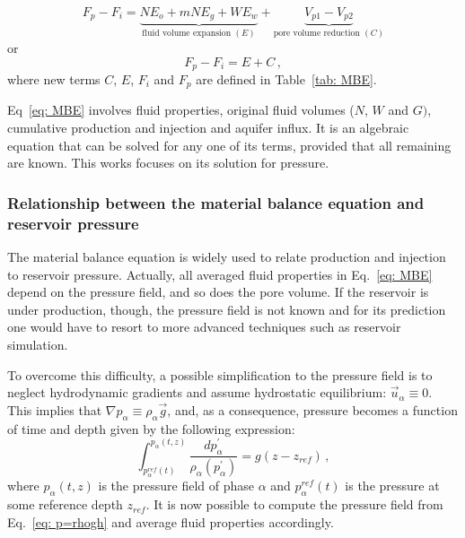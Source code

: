 \documentclass[authoryear,preprint,review,11pt]{elsarticle}
\begin{document}
\begin{equation}\label{eq: MBE}
F_p - F_i= \underbrace{N E_o + mN E_g + W E_w}_{\text{fluid volume expansion } (E)} +\underbrace{V_{p1}-V_{p2}}_{\text{pore volume reduction } (C)}
\end{equation}
or
\begin{equation}\label{eq: MBE_short}
F_p - F_i= E + C \, ,
\end{equation}
where new terms $C$, $E$, $F_i$ and $F_p$ are defined in Table~\ref{tab: MBE}. 

Eq~\eqref{eq: MBE} involves fluid properties, original fluid volumes ($N$, $W$ and $G)$, cumulative production and injection and aquifer influx.
It is an algebraic equation that can be solved for any one of its terms, provided that all remaining are known. This works focuses on its solution for pressure.

\subsubsection{Relationship between the material balance equation and reservoir pressure}


The material balance equation is widely used to relate production and injection to reservoir pressure. Actually, all averaged fluid properties in Eq.~\eqref{eq: MBE} depend on the pressure field, and so does the pore volume. If the reservoir is under production, though, the pressure field is not known and for its prediction one would have to resort to more advanced techniques such as reservoir simulation.


To overcome this difficulty, a possible simplification to the pressure field is to neglect hydrodynamic gradients and assume hydrostatic equilibrium: $\vec{u}_\alpha \equiv 0$. This implies that $\nabla p_\alpha \equiv \rho_\alpha \vec{g}$, and, as a consequence, pressure becomes a function of time and depth given by the following expression:
\begin{equation}\label{eq: p=rhogh}
\int_{p_\alpha^{ref} (t)}^{p_\alpha (t,z)} \frac{dp_\alpha^{'}}{\rho_\alpha \left(p_\alpha^{'}\right)} = g\left(z - z_{ref}\right) \, ,
\end{equation}
where $p_\alpha (t,z)$ is the pressure field of phase $\alpha$ and $p_\alpha^{ref} (t)$ is the pressure at some reference depth $z_{ref}$.
It is now possible to compute the pressure field from Eq.~\eqref{eq: p=rhogh} and average fluid properties accordingly. 
\end{document}
